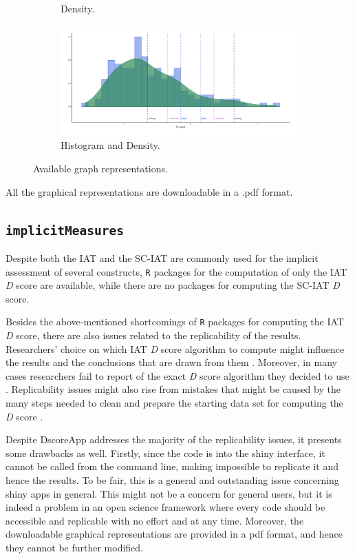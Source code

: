 \documentclass[12pt]{book}
\begin{document}
\begin{figure}[h!]
\begin{subfigure}{0.4\linewidth}
		\caption{Density.}
		\label{fig:dens}
	\end{subfigure}
	\begin{subfigure}{0.4\linewidth}
		\includegraphics[width=\linewidth]{HistDensDscore3.pdf}
		\caption{Histogram and Density.}
		\label{fig:histdens}
	\end{subfigure}
	\caption{\label{fig:dscoregraph} Available graph representations.}
\end{figure}


All the graphical representations are downloadable in a .pdf format.

\subsection{\texttt{implicitMeasures}}\label{sub:package}

Despite both the IAT and the SC-IAT are commonly used for the implicit assessment of several constructs, \texttt{R} packages for the computation of only the IAT \emph{D} score are available, while there are no packages for computing the SC-IAT \emph{D} score.

Besides the above-mentioned shortcomings of \verb*|R| packages for computing the IAT \emph{D} score, there are also issues related to the replicability of the results.
Researchers' choice on which IAT \emph{D} score algorithm to compute might influence the results and the conclusions that are drawn from them \cite{ellithorpe2015}. Moreover, in many cases researchers fail to report of the exact \emph{D} score algorithm they decided to use \cite{ellithorpe2015}. 
Replicability issues might also rise from mistakes that might be caused by the many steps needed to clean and prepare the starting data set for computing the \emph{D} score \cite{ellithorpe2015}. 

Despite DscoreApp addresses the majority of the replicability issues, it presents some drawbacks as well. Firstly, since the code is into the shiny interface, it cannot be called from the command line, making  impossible to replicate it and hence the results. To be fair, this is a general and outstanding issue concerning shiny apps in general. 
This might not be a concern for general users, but it is indeed a problem in an open science framework where every code should be accessible and replicable with no effort and at any time.
Moreover, the downloadable graphical representations are provided in a pdf format, and hence they cannot be further modified.
\end{document}
